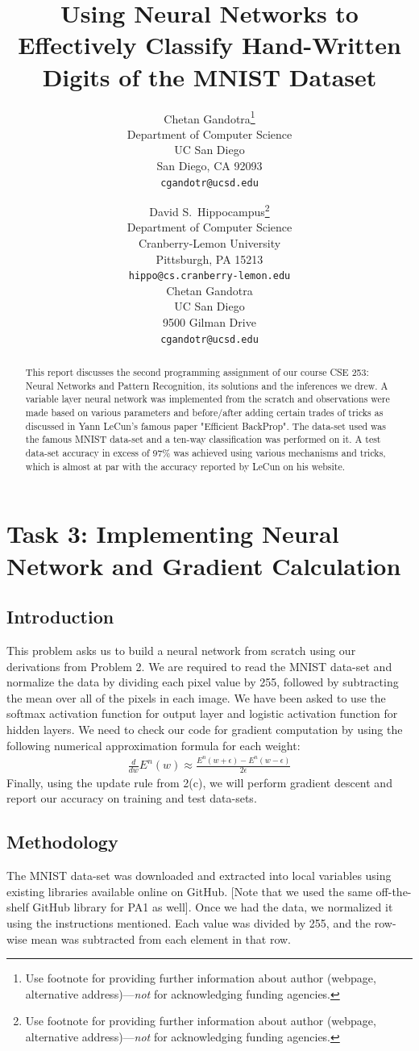 \documentclass{article}
\title{Using Neural Networks to Effectively Classify Hand-Written Digits of the MNIST Dataset}
\author{
  Chetan Gandotra\thanks{Use footnote for providing further
    information about author (webpage, alternative
    address)---\emph{not} for acknowledging funding agencies.} \\
  Department of Computer Science\\
  UC San Diego\\
  San Diego, CA 92093 \\
  \texttt{cgandotr@ucsd.edu} \\
}
\author{
  David S.~Hippocampus\thanks{Use footnote for providing further
    information about author (webpage, alternative
    address)---\emph{not} for acknowledging funding agencies.} \\
  Department of Computer Science\\
  Cranberry-Lemon University\\
  Pittsburgh, PA 15213 \\
  \texttt{hippo@cs.cranberry-lemon.edu} \\
  Chetan Gandotra \\
  UC San Diego \\
  9500 Gilman Drive \\
  \texttt{cgandotr@ucsd.edu} \\
}
\begin{document}

\maketitle

\begin{abstract}
This report discusses the second programming assignment of our course CSE 253: Neural Networks and Pattern Recognition, its solutions and the inferences we drew. A variable layer neural network was implemented from the scratch and observations were made based on various parameters and before/after adding certain trades of tricks as discussed in Yann LeCun's famous paper "Efficient BackProp". The data-set used was the famous MNIST data-set and a ten-way classification was performed on it. A test data-set accuracy in excess of 97\% was achieved using various mechanisms and tricks, which is almost at par with the accuracy reported by LeCun on his website.
\end{abstract}

\section{Task 3: Implementing Neural Network and Gradient Calculation}
\subsection{Introduction}
This problem asks us to build a neural network from scratch using our derivations from Problem 2. We are required to read the MNIST data-set and normalize the data by dividing each pixel value by 255, followed by subtracting the mean over all of the pixels in each image. We have been asked to use the softmax activation function for output layer and logistic activation function for hidden layers. We need to check our code for gradient computation by using the following numerical approximation formula for each weight:
\begin{align}
\frac{d}{dw}E^n(w) \approx \frac{E^n(w+\epsilon) - E^n(w-\epsilon)}{2\epsilon}
\end{align}
Finally, using the update rule from 2(c), we will perform gradient descent and report our accuracy on training and test data-sets.
\subsection{Methodology}
The MNIST data-set was downloaded and extracted into local variables using existing libraries available online on GitHub. [Note that we used the same off-the-shelf GitHub library for PA1 as well]. Once we had the data, we normalized it using the instructions mentioned. Each value was divided by 255, and the row-wise mean was subtracted from each element in that row.
\end{document}
